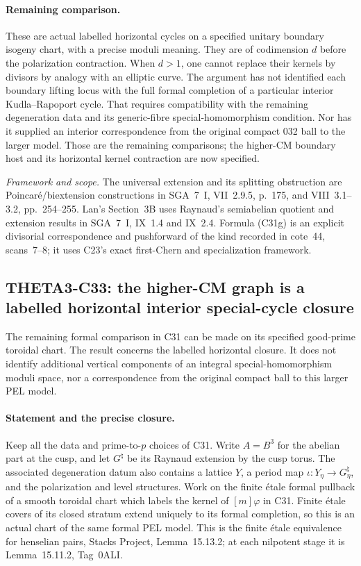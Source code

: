 \documentclass[11pt]{article}
\newcommand{\framework}[1]{\par\smallskip\noindent\textit{Framework and scope.} #1\par}
\theoremstyle{definition}\newtheorem{definition}[theorem]{Definition}\newtheorem{remark}[theorem]{Remark}
\begin{document}
\paragraph{Remaining comparison.}
These are actual labelled horizontal cycles on a specified
unitary boundary isogeny chart, with a precise moduli
meaning. They are of codimension $d$ before the
polarization contraction. When $d>1$, one cannot replace
their kernels by divisors by analogy with an elliptic
curve. The argument has not identified each boundary
lifting locus with the full formal completion of a
particular interior Kudla--Rapoport cycle. That requires
compatibility with the remaining degeneration data and
its generic-fibre special-homomorphism condition. Nor
has it supplied an interior correspondence from the
original compact 032 ball to the larger model. Those
are the remaining comparisons; the higher-CM boundary
host and its horizontal kernel contraction are now
specified.

\framework{The universal extension and its splitting
obstruction are Poincar\'e/biextension constructions in
SGA~7~I, VII~2.9.5, p.~175, and VIII~3.1--3.2,
pp.~254--255. Lan's Section~3B uses Raynaud's
semiabelian quotient and extension results in SGA~7~I,
IX~1.4 and IX~2.4. Formula (C31g) is an explicit
divisorial correspondence and pushforward of the kind
recorded in cote~44, scans~7--8; it uses C23's exact
first-Chern and specialization framework.}


\subsection{THETA3-C33: the higher-CM graph is a labelled horizontal interior special-cycle closure}\label{C33}

The remaining formal comparison in C31 can be made on its
specified good-prime toroidal chart. The result concerns the
labelled horizontal closure. It does not identify additional
vertical components of an integral special-homomorphism
moduli space, nor a correspondence from the original compact
ball to this larger PEL model.

\paragraph{Statement and the precise closure.}
Keep all the data and prime-to-$p$ choices of C31. Write
$A=B^3$ for the abelian part at the cusp, and let
$G^{\natural}$ be its Raynaud extension by the cusp torus.
The associated degeneration datum also contains a lattice
$Y$, a period map $\iota:Y_\eta\to G^{\natural}_\eta$,
and the polarization and level structures. Work on the
finite \'etale formal pullback of a smooth toroidal chart
which labels the kernel of $[m]\varphi$ in C31. Finite
\'etale covers of its closed stratum extend uniquely to
its formal completion, so this is an actual chart of the
same formal PEL model.
This is the finite \'etale equivalence for henselian
pairs, Stacks Project, Lemma~15.13.2; at each
nilpotent stage it is Lemma~15.11.2, Tag~0ALI.
\end{document}
